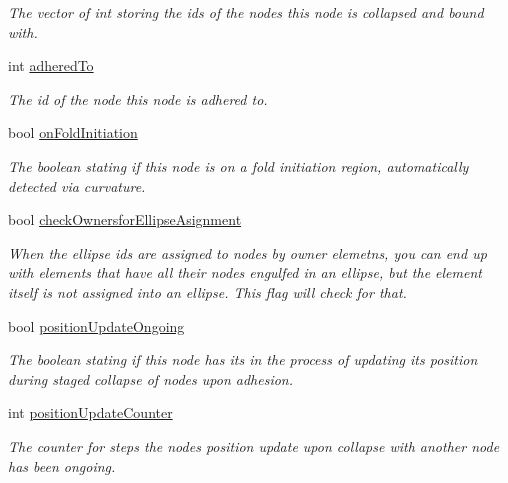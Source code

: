 \begin{DoxyCompactItemize}
\begin{DoxyCompactList}\small\item\em The vector of int storing the ids of the nodes this node is collapsed and bound with. \end{DoxyCompactList}\item 
\hypertarget{classNode_a484ea8b4f71ea5fdfa1036ed1fabfae0}{}int \hyperlink{classNode_a484ea8b4f71ea5fdfa1036ed1fabfae0}{adhered\+To}\label{classNode_a484ea8b4f71ea5fdfa1036ed1fabfae0}

\begin{DoxyCompactList}\small\item\em The id of the node this node is adhered to. \end{DoxyCompactList}\item 
\hypertarget{classNode_a913bf9335efdbd81a352b1ef80654f95}{}bool \hyperlink{classNode_a913bf9335efdbd81a352b1ef80654f95}{on\+Fold\+Initiation}\label{classNode_a913bf9335efdbd81a352b1ef80654f95}

\begin{DoxyCompactList}\small\item\em The boolean stating if this node is on a fold initiation region, automatically detected via curvature. \end{DoxyCompactList}\item 
\hypertarget{classNode_ad41abb2d4571366c2ba8d3a0b46798b6}{}bool \hyperlink{classNode_ad41abb2d4571366c2ba8d3a0b46798b6}{check\+Ownersfor\+Ellipse\+Asignment}\label{classNode_ad41abb2d4571366c2ba8d3a0b46798b6}

\begin{DoxyCompactList}\small\item\em When the ellipse ids are assigned to nodes by owner elemetns, you can end up with elements that have all their nodes engulfed in an ellipse, but the element itself is not assigned into an ellipse. This flag will check for that. \end{DoxyCompactList}\item 
\hypertarget{classNode_acf1e1353abc605a027ca492f44cd15bf}{}bool \hyperlink{classNode_acf1e1353abc605a027ca492f44cd15bf}{position\+Update\+Ongoing}\label{classNode_acf1e1353abc605a027ca492f44cd15bf}

\begin{DoxyCompactList}\small\item\em The boolean stating if this node has its in the process of updating its position during staged collapse of nodes upon adhesion. \end{DoxyCompactList}\item 
\hypertarget{classNode_ac19c4820651632467a0d7f913f002b56}{}int \hyperlink{classNode_ac19c4820651632467a0d7f913f002b56}{position\+Update\+Counter}\label{classNode_ac19c4820651632467a0d7f913f002b56}

\begin{DoxyCompactList}\small\item\em The counter for steps the nodes position update upon collapse with another node has been ongoing. \end{DoxyCompactList}\end{DoxyCompactItemize}


